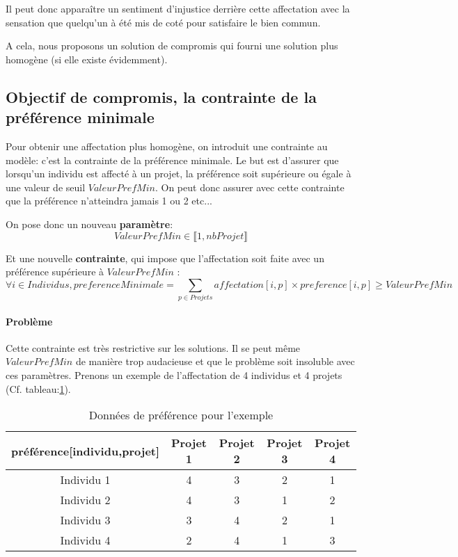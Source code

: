 \documentclass{polytech/polytech}
\begin{document}
Il peut donc apparaître un sentiment d'injustice derrière cette affectation avec la sensation que quelqu'un à été mis de coté pour satisfaire le bien commun.

A cela, nous proposons un solution de compromis qui fourni une solution plus homogène (si elle existe évidemment).

\subsection{Objectif de compromis, la contrainte de la préférence minimale}
\label{sec:pref_min}

Pour obtenir une affectation plus homogène, on introduit une contrainte au modèle: c'est la contrainte de la préférence minimale.
Le but est d'assurer que lorsqu'un individu est affecté à un projet, la préférence soit supérieure ou égale à une valeur de seuil $ValeurPrefMin$.
On peut donc assurer avec cette contrainte que la préférence n'atteindra jamais 1 ou 2 etc...

On pose donc un nouveau \textbf{paramètre}:
$$
ValeurPrefMin \in \llbracket 1,nbProjet \rrbracket
$$

Et une nouvelle \textbf{contrainte}, qui impose que l'affectation soit faite avec un préférence supérieure à $ValeurPrefMin$ :
$$
\forall i \in Individus ,preferenceMinimale = \sum_{p \in Projets} affectation[i,p]\times preference[i,p] \geqslant ValeurPrefMin
$$

\paragraph{Problème} Cette contrainte est très restrictive sur les solutions. Il se peut même $ValeurPrefMin$ de manière trop audacieuse et que le problème soit insoluble avec ces paramètres.
Prenons un exemple de l'affectation de 4 individus et 4 projets (Cf. tableau:\ref{tab:preference_exemple}).

\begin{table}
\caption{Données de préférence pour l'exemple}
\label{tab:preference_exemple}
\begin{tabular}{|c|c|c|c|c|}
\hline 
préférence[individu,projet] & Projet 1 & Projet 2 & Projet 3 & Projet 4 \\ 
\hline 
Individu 1 & 4 & 3 & 2 & 1 \\ 
\hline 
Individu 2 & 4 & 3 & 1 & 2 \\ 
\hline 
Individu 3 & 3 & 4 & 2 & 1 \\ 
\hline 
Individu 4 & 2 & 4 & 1 & 3 \\ 
\hline 
\end{tabular} 
\end{table}
\end{document}
